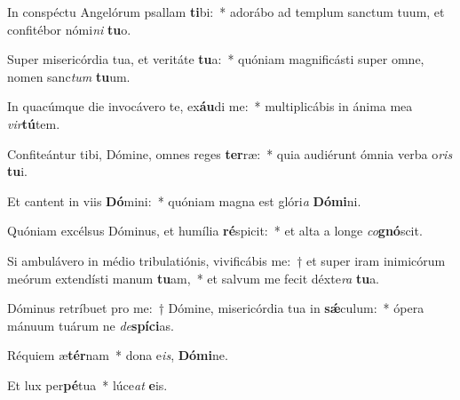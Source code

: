 \item In conspéctu Angelórum psallam \textbf{ti}bi:~* adorábo ad templum sanctum tuum, et confitébor nómi\textit{ni} \textbf{tu}o.

\item Super misericórdia tua, et veritáte \textbf{tu}a:~* quóniam magnificásti super omne, nomen sanc\textit{tum} \textbf{tu}um.

\item In quacúmque die invocávero te, ex\textbf{áu}di me:~* multiplicábis in ánima mea \textit{vir}\textbf{tú}tem.

\item Confiteántur tibi, Dómine, omnes reges \textbf{ter}ræ:~* quia audiérunt ómnia verba o\textit{ris} \textbf{tu}i.

\item Et cantent in viis \textbf{Dó}mini:~* quóniam magna est glóri\textit{a} \textbf{Dó}\textbf{mi}ni.

\item Quóniam excélsus Dóminus, et humília \textbf{ré}spicit:~* et alta a longe \textit{co}\textbf{gnó}scit.

\item Si ambulávero in médio tribulatiónis, vivificábis me:~† et super iram inimicórum meórum extendísti manum \textbf{tu}am,~* et salvum me fecit déxte\textit{ra} \textbf{tu}a.

\item Dóminus retríbuet pro me:~† Dómine, misericórdia tua in \textbf{sǽ}culum:~* ópera mánuum tuárum ne \textit{de}\textbf{spí}\textbf{ci}as.

\item Réquiem æ\textbf{tér}nam~* dona e\textit{is}, \textbf{Dó}\textbf{mi}ne.

\item Et lux per\textbf{pé}tua~* lúce\textit{at} \textbf{e}is.